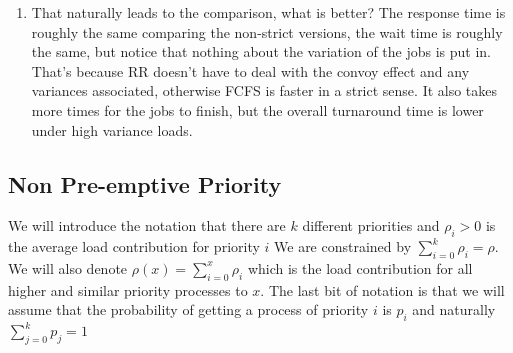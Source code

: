 \begin{enumerate}
\item That naturally leads to the comparison, what is better?
  The response time is roughly the same comparing the non-strict versions, the wait time is roughly the same, but notice that nothing about the variation of the jobs is put in.
  That's because RR doesn't have to deal with the convoy effect and any variances associated, otherwise FCFS is faster in a strict sense.
  It also takes more times for the jobs to finish, but the overall turnaround time is lower under high variance loads.
\end{enumerate}

\subsection{Non Pre-emptive Priority}

We will introduce the notation that there are $k$ different priorities and $\rho_i > 0$ is the average load contribution for priority $i$ We are constrained by $\sum\limits_{i=0}^k \rho_i = \rho$.
We will also denote $\rho(x) = \sum\limits_{i=0}^x \rho_i$ which is the load contribution for all higher and similar priority processes to $x$.
The last bit of notation is that we will assume that the probability of getting a process of priority $i$ is $p_i$ and naturally $\sum\limits_{j=0}^k p_j = 1$
 
